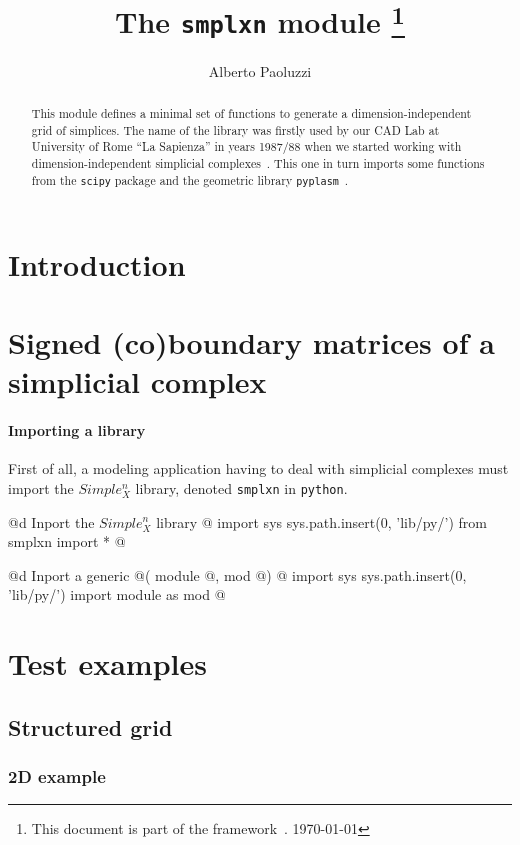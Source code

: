 \documentclass[11pt,oneside]{article}	%
\title{The \texttt{smplxn} module
\footnote{This document is part of the framework~\cite{cclar-proj:2013:00}. \today}
}
\author{Alberto Paoluzzi}
\begin{document}
\maketitle
\nonstopmode

\begin{abstract}
This module defines a minimal set of functions to generate a dimension-independent grid of simplices.
The name of the library was firstly used by our CAD Lab at University of Rome ``La Sapienza'' in years 1987/88 when we started working with dimension-independent simplicial complexes~\cite{Paoluzzi:1993:DMS:169728.169719}. This one in turn imports some functions from the \texttt{scipy} package and the geometric library \texttt{pyplasm}~\cite{}.
\end{abstract}

\tableofcontents\newpage

\section{Introduction}



\section{Signed (co)boundary matrices of a simplicial complex}
\label{simplicial}

\paragraph{Importing a library}
First of all, a modeling application having to deal with simplicial complexes must import the $Simple_X^n$ library, denoted \texttt{smplxn} in \texttt{python}. 

@d Inport the $Simple_X^n$ library
@{
import sys
sys.path.insert(0, 'lib/py/')
from smplxn import *
@}

@d Inport a generic @( module @, mod @)
@{
import sys
sys.path.insert(0, 'lib/py/')
import module as mod
@}

\section{Test examples}

\subsection{Structured grid}

\subsubsection{2D example}
\end{document}
